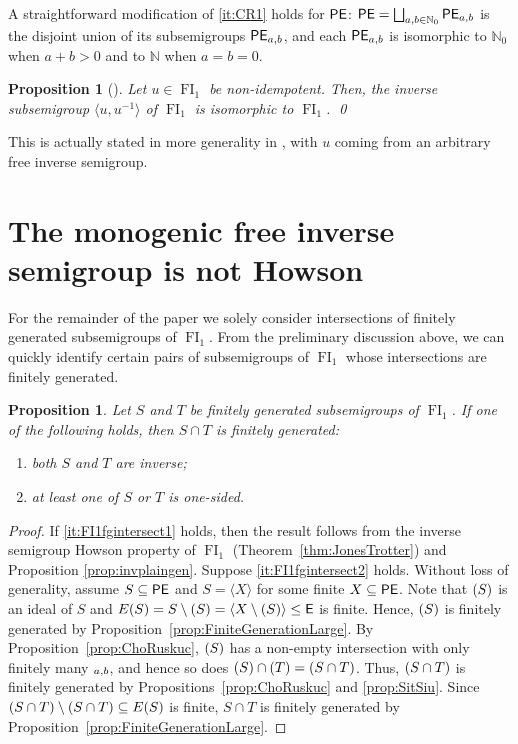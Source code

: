 \documentclass[reqno]{amsart}
\theoremstyle{plain}
\newtheorem{prop}[lem]{Proposition}
\theoremstyle{definition}
\DeclareMathOperator{\FI}{FI}
\let\P\relax
\DeclareMathOperator{\P}{\textup{\textsf{P}}}
\DeclareMathOperator{\E}{\textup{\textsf{E}}}
\DeclareMathOperator{\PE}{\textup{\textsf{PE}}}
\newenvironment{thmenumerate}{\begin{enumerate}[topsep=0mm, leftmargin=14mm,itemsep=1mm,label=\textup{(\roman*)}]
}{\end{enumerate}}
\numberwithin{equation}{section}
\begin{document}
A straightforward modification of \ref{it:CR1} holds for $\PE$: $\PE = \bigsqcup_{a,b\in\mathbb{N}_0}\PE_{a,b}$ is the disjoint union of its subsemigroups $\PE_{a,b}$, and each $\PE_{a,b}$ is isomorphic to $\mathbb{N}_0$ when $a+b>0$ and to $\mathbb{N}$ when $a=b=0$. 


\begin{prop}[{\cite[Corollary 2.5]{Reilly}}]
\label{prop:Reilly}
Let $u\in\FI_1$ be non-idempotent. Then, the inverse subsemigroup $\langle u, u^{-1}\rangle$ of $\FI_1$ is isomorphic to $\FI_1$. \hfill\qed
\end{prop}


This is actually stated in more generality in \cite{Reilly}, with $u$ coming from an arbitrary free inverse semigroup.




\section{The monogenic free inverse semigroup is not Howson}
\label{sec:FI1NonHowson}


For the remainder of the paper we solely consider intersections of finitely generated subsemigroups of $\FI_1$. 
From the preliminary discussion above, we can quickly identify certain pairs of subsemigroups of $\FI_1$ whose intersections are finitely generated.

\begin{prop}
\label{prop:FI1fgintersectpairs}
Let $S$ and $T$ be finitely generated subsemigroups of $\FI_1$. If one of the following holds, then $S\cap T$ is finitely generated:
\begin{thmenumerate}
    \item \label{it:FI1fgintersect1} both $S$ and $T$ are inverse;
    \item \label{it:FI1fgintersect2} at least one of $S$ or $T$ is one-sided.
\end{thmenumerate}
\end{prop}
\begin{proof}
If \ref{it:FI1fgintersect1} holds, then the result follows from the inverse semigroup Howson property of $\FI_1$ (Theorem~\ref{thm:JonesTrotter}) and Proposition \ref{prop:invplaingen}.
Suppose \ref{it:FI1fgintersect2} holds. Without loss of generality, assume $S\subseteq \PE$ and $S = \langle X \rangle$ for some finite $X\subseteq \PE$. Note that $\P(S)$ is an ideal of $S$ and $E(S) = S\setminus\P(S) =\langle X\setminus\P(S)\rangle \leq \E$ is finite. Hence, $\P(S)$ is finitely generated by Proposition~\ref{prop:FiniteGenerationLarge}. By Proposition~\ref{prop:ChoRuskuc}, $\P(S)$ has a non-empty intersection with only finitely many $\P_{a,b}$, and hence so does $\P(S)\cap \P(T) = \P(S\cap T)$. Thus, $\P(S\cap T)$ is finitely generated by Propositions~\ref{prop:ChoRuskuc} and \ref{prop:SitSiu}. Since $(S\cap T)\setminus\P(S\cap T) \subseteq E(S)$ is finite, $S\cap T$ is finitely generated by Proposition~\ref{prop:FiniteGenerationLarge}.
\end{proof}
\end{document}
